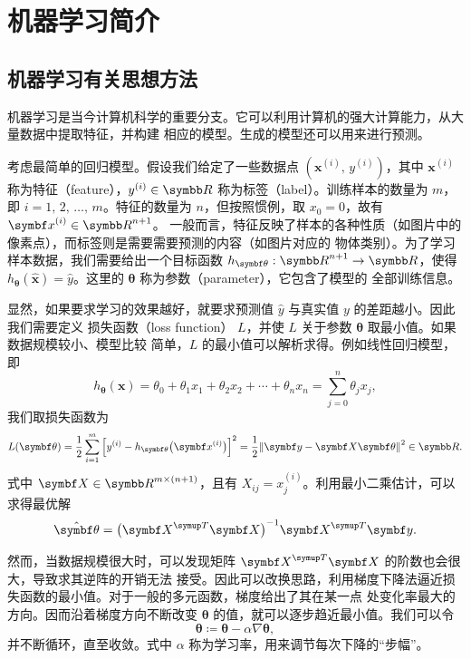 \chapter{机器学习简介}

\section{机器学习有关思想方法}

机器学习是当今计算机科学的重要分支。它可以利用计算机的强大计算能力，从大量数据中提取特征，并构建
相应的模型。生成的模型还可以用来进行预测。

考虑最简单的回归模型。假设我们给定了一些数据点 $(\bm{x}^{(i)}, \, y^{(i)})$，其中 $\bm{x}^{(i)}$
称为特征（feature），$y^{(i)}\in\R$ 称为标签（label）。训练样本的数量为 $m$，即
$i=1,\,2,\,\ldots,\,m$。特征的数量为 $n$，但按照惯例，取 $x_0=0$，故有 $\bm{x}^{(i)}\in\R^{n+1}$。
一般而言，特征反映了样本的各种性质（如图片中的像素点），而标签则是需要需要预测的内容（如图片对应的
物体类别）。为了学习样本数据，我们需要给出一个目标函数 $h_\bm{\theta}: \R^{n+1}\to\R$，使得
$h_\bm{\theta}(\hat{\bm{x}})=\hat{y}$。这里的 $\bm{\theta}$ 称为参数（parameter），它包含了模型的
全部训练信息。

显然，如果要求学习的效果越好，就要求预测值 $\hat{y}$ 与真实值 $y$ 的差距越小。因此我们需要定义
损失函数（loss function） $L$，并使 $L$ 关于参数 $\bm{\theta}$ 取最小值。如果数据规模较小、模型比较
简单，$L$ 的最小值可以解析求得。例如线性回归模型，即
\begin{equation}
  h_\bm{\theta} (\bm{x})
  = \theta_0 + \theta_1 x_1 + \theta_2 x_2 + \cdots + \theta_n x_n
  = \sum_{j=0}^n \theta_j x_j,
\end{equation}
我们取损失函数为
\begin{equation}
  \label{eq:loss-function-linear}
  L(\bm{\theta})
  = \frac{1}{2} \sum_{i=1}^m \qty\Big[y^{(i)} - h_\bm{\theta}\qty\big(\bm{x}^{(i)})]^2
  = \frac{1}{2} \norm{\bm{y} - \bm{X}\bm{\theta}}^2 \in \R.
\end{equation}
式中 $\bm{X}\in\R^{m\times(n+1)}$，且有 $X_{ij} = x^{(i)}_j$。利用最小二乘估计，可以求得最优解
\begin{equation}
  \hat{\bm{\theta}} = \qty\big(\bm{X}^\trans\bm{X})^{-1} \bm{X}^\trans \bm{y}.
\end{equation}

然而，当数据规模很大时，可以发现矩阵 $\bm{X}^\trans\bm{X}$ 的阶数也会很大，导致求其逆阵的开销无法
接受。因此可以改换思路，利用梯度下降法逼近损失函数的最小值。对于一般的多元函数，梯度给出了其在某一点
处变化率最大的方向。因而沿着梯度方向不断改变 $\bm{\theta}$ 的值，就可以逐步趋近最小值。我们可以令
\begin{equation}
  \bm{\theta} \coloneq \bm{\theta} - \alpha\nabla\bm{\theta},
\end{equation}
并不断循环，直至收敛。式中 $\alpha$ 称为学习率，用来调节每次下降的“步幅”。

